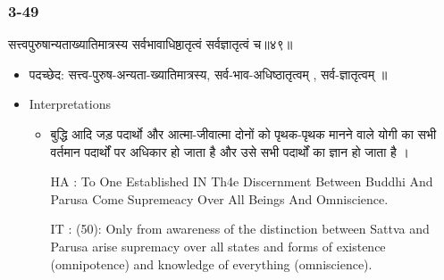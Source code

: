 \begin{frame}[fragile]\frametitle{3-49}
\begin{sanskrit}
सत्त्वपुरुषान्यताख्यातिमात्रस्य सर्वभावाधिष्ठातृत्वं सर्वज्ञातृत्वं च॥४९॥
\end{sanskrit}

	\begin{itemize}
	\item पदच्छेद:  सत्त्व-पुरुष-अन्यता-ख्यातिमात्रस्य, सर्व-भाव-अधिष्ठातृत्वम् , सर्व-ज्ञातृत्वम् ॥
	\item Interpretations
		\begin{itemize}	
		\item बुद्धि आदि जड़ पदार्थो और आत्मा-जीवात्मा दोनों को पृथक-पृथक मानने वाले योगी का सभी वर्तमान पदार्थों पर अधिकार हो जाता है और उसे सभी पदार्थों का ज्ञान हो जाता है ।
		\item [HA]: To One Established IN Th4e Discernment Between Buddhi And Parusa Come Supremeacy Over All Beings And Omniscience.
		\item [IT]: (50): Only from awareness of the distinction between Sattva and Parusa arise supremacy over all states and forms of existence (omnipotence) and knowledge of everything (omniscience).

		\end{itemize}
	\end{itemize}
\end{frame}

